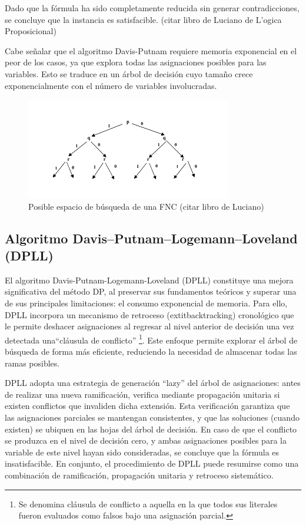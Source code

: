 Dado que la fórmula ha sido completamente reducida sin generar contradicciones, se concluye que la instancia es satisfacible. (citar libro de Luciano de L'ogica Proposicional)

Cabe señalar que el algoritmo Davis-Putnam requiere memoria exponencial en el peor de los casos, ya que explora todas las asignaciones posibles para las variables. Esto se traduce en un árbol de decisión cuyo tamaño crece exponencialmente con el número de variables involucradas.

\begin{figure}[ht]
    \centering
    \includegraphics[width=0.8\textwidth]{Graphics/arboldp.png}
    \caption{Posible espacio de b\'usqueda de una FNC (citar libro de Luciano)}
    \label{fig:arbol DP}
\end{figure}


\subsection{Algoritmo Davis–Putnam–Logemann–Loveland (DPLL)}
\label{subsec:dpll}
El algoritmo Davis-Putnam-Logemann-Loveland (DPLL) constituye una mejora significativa del método DP, al preservar sus fundamentos teóricos y superar una de sus principales limitaciones: el consumo exponencial de memoria. Para ello, DPLL incorpora un mecanismo de retroceso (extit{backtracking}) cronológico que le permite deshacer asignaciones al regresar al nivel anterior de decisión una vez detectada una``cláusula de conflicto'' \footnote{Se denomina cláusula de conflicto a aquella en la que todos sus literales fueron evaluados como falsos bajo una asignación parcial.}. Este enfoque permite explorar el árbol de búsqueda de forma más eficiente, reduciendo la necesidad de almacenar todas las ramas posibles.

DPLL adopta una estrategia de generación ``lazy'' del árbol de asignaciones: antes de realizar una nueva ramificación, verifica mediante propagación unitaria si existen conflictos que invaliden dicha extensión. Esta verificación garantiza que las asignaciones parciales se mantengan consistentes, y que las soluciones (cuando existen) se ubiquen en las hojas del árbol de decisión. En caso de que el conflicto se produzca en el nivel de decisión cero, y ambas asignaciones posibles para la variable de este nivel hayan sido consideradas, se concluye que la fórmula es insatisfacible. En conjunto, el procedimiento de DPLL puede resumirse como una combinación de ramificación, propagación unitaria y retroceso sistemático.

